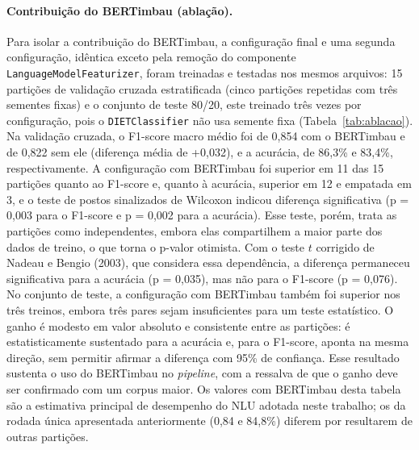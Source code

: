 \documentclass[12pt,a4paper]{extarticle}
\begin{document}
\paragraph{Contribuição do BERTimbau (ablação).} Para isolar a contribuição do BERTimbau, a configuração final e uma segunda configuração, idêntica exceto pela remoção do componente \texttt{LanguageModel\allowbreak{}Featurizer}, foram treinadas e testadas nos mesmos arquivos: 15 partições de validação cruzada estratificada (cinco partições repetidas com três sementes fixas) e o conjunto de teste 80/20, este treinado três vezes por configuração, pois o \texttt{DIETClassifier} não usa semente fixa (Tabela~\ref{tab:ablacao}). Na validação cruzada, o F1-score macro médio foi de 0,854 com o BERTimbau e de 0,822 sem ele (diferença média de +0,032), e a acurácia, de 86,3\% e 83,4\%, respectivamente. A configuração com BERTimbau foi superior em 11 das 15 partições quanto ao F1-score e, quanto à acurácia, superior em 12 e empatada em 3, e o teste de postos sinalizados de Wilcoxon indicou diferença significativa (p = 0,003 para o F1-score e p = 0,002 para a acurácia). Esse teste, porém, trata as partições como independentes, embora elas compartilhem a maior parte dos dados de treino, o que torna o p-valor otimista. Com o teste $t$ corrigido de Nadeau e Bengio (2003), que considera essa dependência, a diferença permaneceu significativa para a acurácia (p = 0,035), mas não para o F1-score (p = 0,076). No conjunto de teste, a configuração com BERTimbau também foi superior nos três treinos, embora três pares sejam insuficientes para um teste estatístico. O ganho é modesto em valor absoluto e consistente entre as partições: é estatisticamente sustentado para a acurácia e, para o F1-score, aponta na mesma direção, sem permitir afirmar a diferença com 95\% de confiança. Esse resultado sustenta o uso do BERTimbau no \textit{pipeline}, com a ressalva de que o ganho deve ser confirmado com um corpus maior. Os valores com BERTimbau desta tabela são a estimativa principal de desempenho do NLU adotada neste trabalho; os da rodada única apresentada anteriormente (0,84 e 84,8\%) diferem por resultarem de outras partições.
\end{document}
